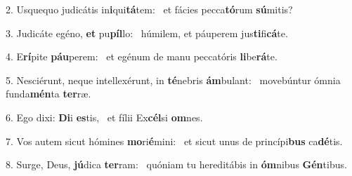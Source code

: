 2. Usquequo judicátis in\textbf{i}qui\textbf{tá}tem: \ast\  et fácies pecca\textbf{tó}rum \textbf{sú}mitis?\

3. Judicáte egéno, \textbf{et} pu\textbf{píl}lo: \ast\  húmilem, et páuperem jus\textbf{ti}fi\textbf{cá}te.\

4. E\textbf{rí}pite \textbf{páu}perem: \ast\  et egénum de manu peccatóris \textbf{li}be\textbf{rá}te.\

5. Nesciérunt, neque intellexérunt, in \textbf{té}nebris \textbf{ám}bulant: \ast\  movebúntur ómnia funda\textbf{mén}ta \textbf{ter}ræ.\

6. Ego dixi: \textbf{Di}i \textbf{es}tis, \ast\  et fílii Ex\textbf{cél}si \textbf{om}nes.\

7. Vos autem sicut hómines \textbf{mo}ri\textbf{é}mini: \ast\  et sicut unus de princípi\textbf{bus} ca\textbf{dé}tis.\

8. Surge, Deus, \textbf{jú}dica \textbf{ter}ram: \ast\  quóniam tu hereditábis in \textbf{óm}nibus \textbf{Gén}tibus.\

